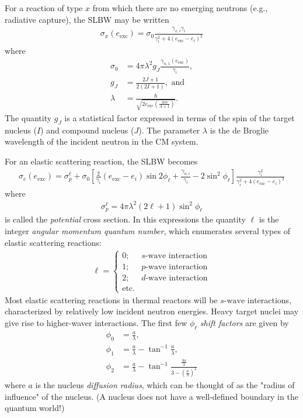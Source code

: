 \documentclass[11pt]{article}
\begin{document}
For a reaction of type \(x\) from which there are no emerging neutrons (e.g., radiative capture), the SLBW may be written
\begin{align}
  \sigma_x(e_{\text{exc}}) = \sigma_0 \frac{\gamma_{x,i}\gamma_i}{\gamma_i^2+4(e_\text{exc}-e_i)^2}
\end{align}
where
\begin{align}
 \sigma_0 &= 4\pi \lambda^2 g_J \frac{\gamma_{n,1}(e_\text{exc})}{\gamma_i},  \\
  g_J &= \frac{2J+1}{2(2I+1)}, \text{ and} \\
  \lambda &= \frac{\hbar}{\sqrt{2e_\text{exc} \left( \frac{Am}{A+1} \right)}}.
\end{align}
The quantity \(g_J\) is a statistical factor expressed in terms of the spin of the target nucleus (\(I\)) and compound nucleus (\(J\)).  The parameter \(\lambda\) is the de Broglie wavelength of the incident neutron in the CM system.

For an elastic scattering reaction, the SLBW becomes
\begin{align}
  \sigma_e(e_\text{exc}) = \sigma_p^\ell 
                         + \sigma_0 \left[ \frac{2}{\gamma_i}(e_\text{exc}-e_i) \sin 2\phi_\ell 
                                         + \frac{\gamma_{n,i}}{\gamma_i} -2 \sin^2 \phi_\ell \right] \frac{\gamma_i^2}{\gamma_i^2+4(e_\text{exc}-e_i)^2}
\end{align}
where
\begin{align}
  \sigma_p^\ell = 4\pi \lambda^2 \left( 2\ell + 1 \right) \sin^2 \phi_\ell
\end{align}
is called the \emph{potential} cross section.
In this expressions the quantity \(\ell\) is the integer \emph{angular momentum quantum number}, which enumerates several types of elastic scattering reactions:
\begin{align}
  \ell = 
  \begin{cases}
    0; & s\text{-wave interaction} \\
    1; & p\text{-wave interaction} \\
    2; & d\text{-wave interaction} \\
    \text{etc.} &
  \end{cases}
\end{align}
Most elastic scattering reactions in thermal reactors will be \(s\text{-wave}\) interactions, characterized by relatively low incident neutron energies.  Heavy target nuclei may give rise to higher-waver interactions.  The first few \(\phi_\ell\) \emph{shift factors} are given by
\begin{align}
  \phi_0 &= \frac{a}{\lambda}, \\
  \phi_1 &= \frac{a}{\lambda} - \tan^{-1} \frac{a}{\lambda}, \\
  \phi_2 &= \frac{a}{\lambda} - \tan^{-1} \frac{\frac{3a}{\lambda}}{3 - \left( \frac{a}{\lambda} \right)^2}
\end{align}
where \(a\) is the nucleus \emph{diffusion radius}, which can be thought of as the "radius of influence" of the nucleus.  (A nucleus does not have a well-defined boundary in the quantum world!)
\end{document}
